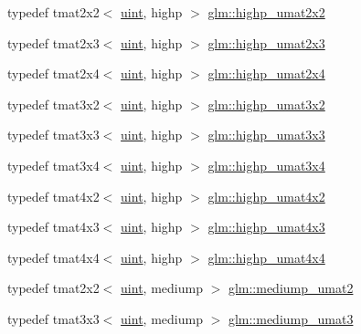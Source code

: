 \begin{DoxyCompactItemize}
\item 
typedef tmat2x2$<$ \hyperlink{stb__image_8c_a91ad9478d81a7aaf2593e8d9c3d06a14}{uint}, highp $>$ \hyperlink{group__gtc__matrix__integer_gaeb546847abfc7c3c09ea8172987ebb16}{glm\+::highp\+\_\+umat2x2}
\item 
typedef tmat2x3$<$ \hyperlink{stb__image_8c_a91ad9478d81a7aaf2593e8d9c3d06a14}{uint}, highp $>$ \hyperlink{group__gtc__matrix__integer_gab058a0a12ea7f604d92baeb7a0e54f3b}{glm\+::highp\+\_\+umat2x3}
\item 
typedef tmat2x4$<$ \hyperlink{stb__image_8c_a91ad9478d81a7aaf2593e8d9c3d06a14}{uint}, highp $>$ \hyperlink{group__gtc__matrix__integer_gafcec07e857ea0445d93680411e86482c}{glm\+::highp\+\_\+umat2x4}
\item 
typedef tmat3x2$<$ \hyperlink{stb__image_8c_a91ad9478d81a7aaf2593e8d9c3d06a14}{uint}, highp $>$ \hyperlink{group__gtc__matrix__integer_ga7484178233773045088b42f362dade86}{glm\+::highp\+\_\+umat3x2}
\item 
typedef tmat3x3$<$ \hyperlink{stb__image_8c_a91ad9478d81a7aaf2593e8d9c3d06a14}{uint}, highp $>$ \hyperlink{group__gtc__matrix__integer_ga770b01686af4fbbb13bbd7bd97d60fe4}{glm\+::highp\+\_\+umat3x3}
\item 
typedef tmat3x4$<$ \hyperlink{stb__image_8c_a91ad9478d81a7aaf2593e8d9c3d06a14}{uint}, highp $>$ \hyperlink{group__gtc__matrix__integer_gaa2fb29026c9c80c7d17b5389e36d6aa7}{glm\+::highp\+\_\+umat3x4}
\item 
typedef tmat4x2$<$ \hyperlink{stb__image_8c_a91ad9478d81a7aaf2593e8d9c3d06a14}{uint}, highp $>$ \hyperlink{group__gtc__matrix__integer_ga4015bf99a981bf271fd516f9b2cb6724}{glm\+::highp\+\_\+umat4x2}
\item 
typedef tmat4x3$<$ \hyperlink{stb__image_8c_a91ad9478d81a7aaf2593e8d9c3d06a14}{uint}, highp $>$ \hyperlink{group__gtc__matrix__integer_gaa394320db559302e18c8b64013b8d7fb}{glm\+::highp\+\_\+umat4x3}
\item 
typedef tmat4x4$<$ \hyperlink{stb__image_8c_a91ad9478d81a7aaf2593e8d9c3d06a14}{uint}, highp $>$ \hyperlink{group__gtc__matrix__integer_gaf5365128f6fd506442843fb5a441f385}{glm\+::highp\+\_\+umat4x4}
\item 
typedef tmat2x2$<$ \hyperlink{stb__image_8c_a91ad9478d81a7aaf2593e8d9c3d06a14}{uint}, mediump $>$ \hyperlink{group__gtc__matrix__integer_ga85bc35173415dba31bb964c2940feeec}{glm\+::mediump\+\_\+umat2}
\item 
typedef tmat3x3$<$ \hyperlink{stb__image_8c_a91ad9478d81a7aaf2593e8d9c3d06a14}{uint}, mediump $>$ \hyperlink{group__gtc__matrix__integer_ga953d4cb3e70d85567756b3fbcca0e9e9}{glm\+::mediump\+\_\+umat3}

\end{DoxyCompactItemize}
